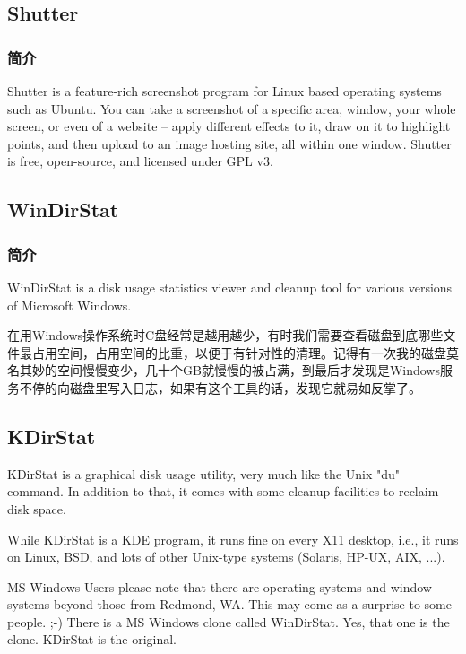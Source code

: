 \documentclass[paper=a4,fontsize=11pt]{article}
\begin{document}
	
	\subsection{Shutter}
	
	\subsubsection{简介}
	
	Shutter is a feature-rich screenshot program for Linux based operating systems such as Ubuntu. You can take a screenshot of a specific area, window, your whole screen, or even of a website – apply different effects to it, draw on it to highlight points, and then upload to an image hosting site, all within one window. Shutter is free, open-source, and licensed under GPL v3.	
	
	\subsection{WinDirStat}
	
	\subsubsection{简介}
	WinDirStat is a disk usage statistics viewer and cleanup tool for various versions of Microsoft Windows.
	
	在用Windows操作系统时C盘经常是越用越少，有时我们需要查看磁盘到底哪些文件最占用空间，占用空间的比重，以便于有针对性的清理。记得有一次我的磁盘莫名其妙的空间慢慢变少，几十个GB就慢慢的被占满，到最后才发现是Windows服务不停的向磁盘里写入日志，如果有这个工具的话，发现它就易如反掌了。
		
	\subsection{KDirStat}
	KDirStat is a graphical disk usage utility, very much like the Unix "du" command. In addition to that, it comes with some cleanup facilities to reclaim disk space.
	
	While KDirStat is a KDE program, it runs fine on every X11 desktop, i.e., it runs on Linux, BSD, and lots of other Unix-type systems (Solaris, HP-UX, AIX, ...).
	
	MS Windows Users please note that there are operating systems and window systems beyond those from Redmond, WA. This may come as a surprise to some people. ;-) There is a MS Windows clone called WinDirStat. Yes, that one is the clone. KDirStat is the original.
		
\end{document}
